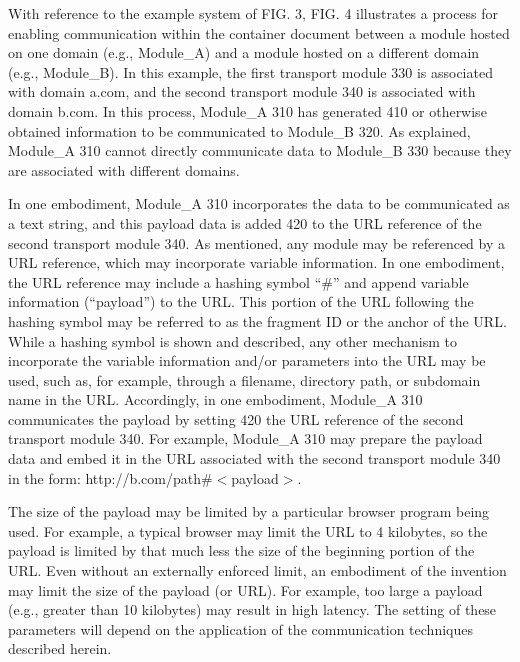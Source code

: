 With reference to the example system of FIG. 3, FIG. 4
illustrates a process for enabling communication within the container
document between a module hosted on one domain (e.g., Module\_A) and a
module hosted on a different domain (e.g., Module\_B). In this example,
the first transport module 330 is associated with domain a.com,
and the second transport module 340 is associated with domain
b.com. In this process, Module\_A 310 has generated 410
or otherwise obtained information to be communicated to Module\_B
320. As explained, Module\_A 310 cannot directly
communicate data to Module\_B 330 because they are associated
with different domains.



In one embodiment,
Module\_A 310 incorporates the data to be communicated as a text
string, and this payload data is added 420 to the URL reference
of the second transport module 340. As mentioned, any module
may be referenced by a URL reference, which may incorporate variable
information. In one embodiment, the URL reference may include a
hashing symbol ``\#'' and append variable information
(``payload'') to the URL. This portion of the URL
following the hashing symbol may be referred to as the fragment ID or
the anchor of the URL. While a hashing symbol is shown and described,
any other mechanism to incorporate the variable information and/or
parameters into the URL may be used, such as, for example, through a
filename, directory path, or subdomain name in the URL. Accordingly,
in one embodiment, Module\_A 310 communicates the payload by
setting 420 the URL reference of the second transport module
340. For example, Module\_A 310 may prepare the payload
data and embed it in the URL associated with the second transport
module 340 in the form: http://b.com/path\#$<$payload$>$.



The size of the payload may be
limited by a particular browser program being used. For example, a
typical browser may limit the URL to 4 kilobytes, so the payload is
limited by that much less the size of the beginning portion of the
URL. Even without an externally enforced limit, an embodiment of the
invention may limit the size of the payload (or URL). For example, too
large a payload (e.g., greater than 10 kilobytes) may result in high
latency. The setting of these parameters will depend on the
application of the communication techniques described herein.




